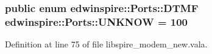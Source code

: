 \hypertarget{namespaceedwinspire_1_1Ports_ab4d6b4e5fffd7740bd68fd1594b67205}{
\subsubsection[{U\-N\-K\-N\-O\-W}]{\setlength{\rightskip}{0pt plus 5cm}public enum {\bf edwinspire\-::\-Ports\-::\-D\-T\-M\-F} edwinspire\-::\-Ports\-::\-U\-N\-K\-N\-O\-W = 100}}\label{namespaceedwinspire_1_1Ports_ab4d6b4e5fffd7740bd68fd1594b67205}


Definition at line 75 of file libspire\-\_\-modem\-\_\-new.\-vala.


